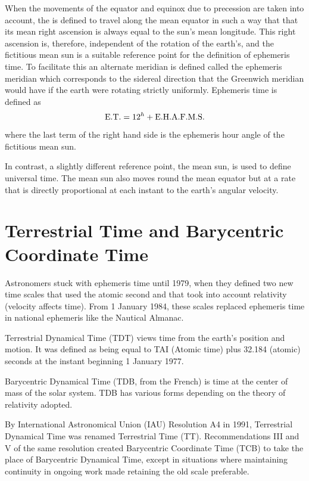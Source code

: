 When the movements of the equator and equinox due to precession are taken into
account, the {} is defined to travel along the mean 
equator in such a way that that its mean right ascension is always equal to 
the sun's mean longitude. This right ascension is, therefore, independent 
of the rotation of the earth's, and the fictitious mean sun is a 
suitable reference point for the definition of ephemeris time. To 
facilitate this an alternate meridian is defined called the ephemeris 
meridian which corresponds to the sidereal direction that the
Greenwich meridian would have if the earth were rotating strictly uniformly. 
Ephemeris time is defined as 
\[
{\rm E.T.}=12^h+{\rm E.H.A.F.M.S.}
\]
where the last term of the right hand side is the ephemeris hour angle of the 
fictitious mean sun. 

In contrast, a slightly different reference point, the mean sun,
is used to define universal time. The mean sun also moves round the mean 
equator but at a rate that is directly proportional at each instant to the 
earth's angular velocity. 

\section{Terrestrial Time and Barycentric Coordinate Time}

Astronomers stuck with ephemeris time until 1979, when they defined two new 
time scales that used the atomic second and that took into account 
relativity (velocity affects time). From 1 January 1984, these scales 
replaced ephemeris time in national ephemeris like the Nautical Almanac.

Terrestrial Dynamical Time (TDT) views time from the earth's position and 
motion. It was defined as being equal to TAI (Atomic time) plus 
32.184 (atomic) seconds at the instant beginning 1 January 1977.

Barycentric Dynamical Time (TDB, from the French) is time at the center of 
mass of the solar system. TDB has various forms depending on the theory of 
relativity adopted.

By International Astronomical Union (IAU) Resolution A4 in 1991, 
Terrestrial Dynamical Time was renamed Terrestrial Time (TT). 
Recommendations III and V of the same resolution created 
Barycentric Coordinate Time (TCB) to take the place of Barycentric 
Dynamical Time, except in situations where maintaining continuity in 
ongoing work made retaining the old scale preferable.

